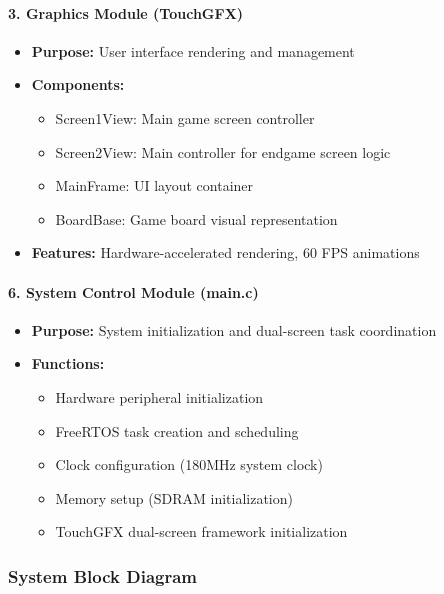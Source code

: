 \documentclass[12pt,a4paper]{article}
\begin{document}
\paragraph{3. Graphics Module (TouchGFX)}
\begin{itemize}[leftmargin=*]
    \item \textbf{Purpose:} User interface rendering and management
    \item \textbf{Components:}
    \begin{itemize}
        \item Screen1View: Main game screen controller
        \item Screen2View: Main controller for endgame screen logic
        \item MainFrame: UI layout container
        \item BoardBase: Game board visual representation
    \end{itemize}
    \item \textbf{Features:} Hardware-accelerated rendering, 60 FPS animations
\end{itemize}

\paragraph{6. System Control Module (main.c)}
\begin{itemize}[leftmargin=*]
    \item \textbf{Purpose:} System initialization and dual-screen task coordination
    \item \textbf{Functions:}
    \begin{itemize}
        \item Hardware peripheral initialization
        \item FreeRTOS task creation and scheduling
        \item Clock configuration (180MHz system clock)
        \item Memory setup (SDRAM initialization)
        \item TouchGFX dual-screen framework initialization
    \end{itemize}
\end{itemize}

\subsubsection{System Block Diagram}
\end{document}
